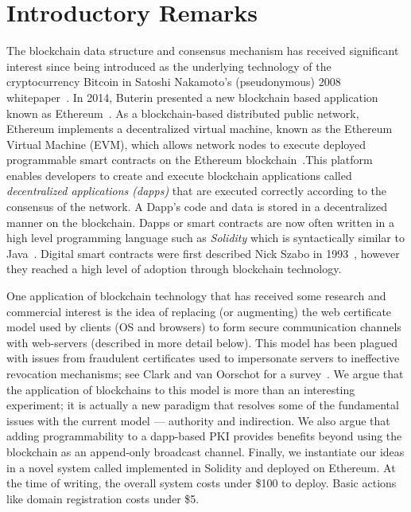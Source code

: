 \section{Introductory Remarks}

The blockchain data structure and consensus mechanism has received significant interest since being introduced as the underlying technology of the cryptocurrency Bitcoin in Satoshi Nakamoto's (pseudonymous) 2008 whitepaper~\cite{nakamoto2008bitcoin}. In 2014, Buterin presented a new blockchain based application known as Ethereum~\cite{buterin2014next}. As a blockchain-based distributed public network, Ethereum implements a decentralized virtual machine, known as the Ethereum Virtual Machine (EVM), which allows network nodes to execute deployed programmable smart contracts on the Ethereum blockchain~\cite{wood2014ethereum}.This platform enables developers to create and execute blockchain applications called \textit{decentralized applications (dapps)} that are executed correctly according to the consensus of the network. A Dapp's code and data is stored in a decentralized manner on the blockchain. Dapps or smart contracts are now often written in a high level programming language such as \textit{Solidity} which is syntactically similar to Java~\cite{Ethereum41:online}. Digital smart contracts were first described Nick Szabo in 1993~\cite{szabo1997formalizing}, however they reached a high level of adoption through blockchain technology.

One application of blockchain technology that has received some research and commercial interest is the idea of replacing (or augmenting) the web certificate model used by clients (OS and browsers) to form secure communication channels with web-servers (described in more detail below). This model has been plagued with issues from fraudulent certificates used to impersonate servers to ineffective revocation mechanisms; see Clark and van Oorschot for a survey~\cite{CO13}. We argue that the application of blockchains to this model is more than an interesting experiment; it is actually a new \UA paradigm that resolves some of the fundamental issues with the current model --- authority and indirection. We also argue that adding programmability to a dapp-based PKI provides benefits beyond using the blockchain as an append-only broadcast channel. Finally, we instantiate our ideas in a novel system called \Ghazal implemented in Solidity and deployed on Ethereum. At the time of writing, the overall system costs under \$100 to deploy. Basic actions like domain registration costs under \$5. 


